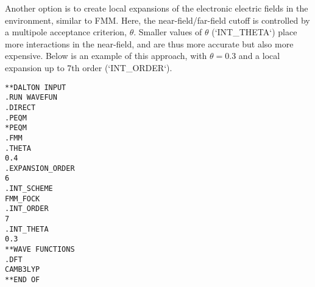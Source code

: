 Another option is to create local expansions of the electronic electric fields in the environment, similar to FMM.
Here, the near-field/far-field cutoff is controlled by a multipole acceptance criterion, $\theta$.
Smaller values of $\theta$ (`INT\_THETA`) place more interactions in the near-field, and are thus more accurate but also more expensive.
Below is an example of this approach, with $\theta=0.3$ and a local expansion up to 7th order (`INT\_ORDER`).

\begin{verbatim}
**DALTON INPUT
.RUN WAVEFUN
.DIRECT
.PEQM
*PEQM
.FMM
.THETA
0.4
.EXPANSION_ORDER
6
.INT_SCHEME
FMM_FOCK
.INT_ORDER
7
.INT_THETA
0.3
**WAVE FUNCTIONS
.DFT
CAMB3LYP
**END OF
\end{verbatim}
